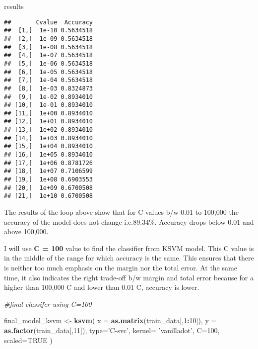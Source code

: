 \documentclass[
]{article}
\newenvironment{Shaded}{\begin{snugshade}}{\end{snugshade}}
\newcommand{\CommentTok}[1]{\textcolor[rgb]{0.56,0.35,0.01}{\textit{#1}}}
\newcommand{\DataTypeTok}[1]{\textcolor[rgb]{0.13,0.29,0.53}{#1}}
\newcommand{\DecValTok}[1]{\textcolor[rgb]{0.00,0.00,0.81}{#1}}
\newcommand{\KeywordTok}[1]{\textcolor[rgb]{0.13,0.29,0.53}{\textbf{#1}}}
\newcommand{\NormalTok}[1]{#1}
\newcommand{\OperatorTok}[1]{\textcolor[rgb]{0.81,0.36,0.00}{\textbf{#1}}}
\newcommand{\OtherTok}[1]{\textcolor[rgb]{0.56,0.35,0.01}{#1}}
\newcommand{\StringTok}[1]{\textcolor[rgb]{0.31,0.60,0.02}{#1}}
\begin{document}
\begin{Shaded}
\begin{Highlighting}[]
\NormalTok{results}
\end{Highlighting}
\end{Shaded}

\begin{verbatim}
##       Cvalue  Accuracy
##  [1,]  1e-10 0.5634518
##  [2,]  1e-09 0.5634518
##  [3,]  1e-08 0.5634518
##  [4,]  1e-07 0.5634518
##  [5,]  1e-06 0.5634518
##  [6,]  1e-05 0.5634518
##  [7,]  1e-04 0.5634518
##  [8,]  1e-03 0.8324873
##  [9,]  1e-02 0.8934010
## [10,]  1e-01 0.8934010
## [11,]  1e+00 0.8934010
## [12,]  1e+01 0.8934010
## [13,]  1e+02 0.8934010
## [14,]  1e+03 0.8934010
## [15,]  1e+04 0.8934010
## [16,]  1e+05 0.8934010
## [17,]  1e+06 0.8781726
## [18,]  1e+07 0.7106599
## [19,]  1e+08 0.6903553
## [20,]  1e+09 0.6700508
## [21,]  1e+10 0.6700508
\end{verbatim}

The results of the loop above show that for C values b/w 0.01 to 100,000
the accuracy of the model does not change i.e.89.34\%. Accuracy drops
below 0.01 and above 100,000.

I will use \textbf{C = 100} value to find the classifier from KSVM
model. This C value is in the middle of the range for which accuracy is
the same. This ensures that there is neither too much emphasis on the
margin nor the total error. At the same time, it also indicates the
right trade-off b/w margin and total error because for a higher than
100,000 C and lower than 0.01 C, accuracy is lower.

\begin{Shaded}
\begin{Highlighting}[]
\CommentTok{#final classifer using C=100}

\NormalTok{final_model_ksvm <-}\StringTok{ }\KeywordTok{ksvm}\NormalTok{( }\DataTypeTok{x =} \KeywordTok{as.matrix}\NormalTok{(train_data[,}\DecValTok{1}\OperatorTok{:}\DecValTok{10}\NormalTok{]),}
                    \DataTypeTok{y =} \KeywordTok{as.factor}\NormalTok{(train_data[,}\DecValTok{11}\NormalTok{]),}
                    \DataTypeTok{type=}\StringTok{'C-svc'}\NormalTok{,}
                    \DataTypeTok{kernel=} \StringTok{'vanilladot'}\NormalTok{,}
                    \DataTypeTok{C=}\DecValTok{100}\NormalTok{, }\DataTypeTok{scaled=}\OtherTok{TRUE}
\NormalTok{                    ) }
\end{Highlighting}
\end{Shaded}
\end{document}
